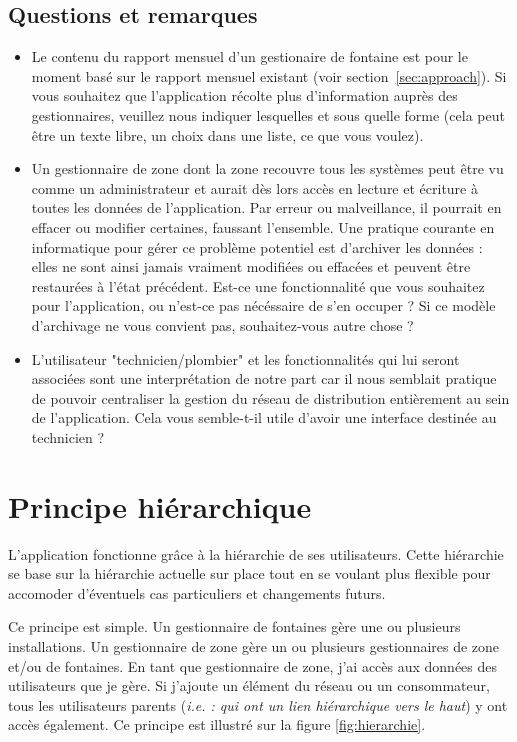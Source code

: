 \documentclass[a4paper, 11pt]{article}
\begin{document}
  \subsection{Questions et remarques}
  \begin{itemize}
    \item Le contenu du rapport mensuel d'un gestionaire de fontaine est pour le moment basé sur le rapport mensuel existant (voir section~\ref{sec:approach}). Si vous souhaitez que l'application récolte plus d'information auprès des gestionnaires, veuillez nous indiquer lesquelles et sous quelle forme (cela peut être un texte libre, un choix dans une liste, ce que vous voulez).
    \item Un gestionnaire de zone dont la zone recouvre tous les systèmes peut être vu comme un administrateur et aurait dès lors accès en lecture et écriture à toutes les données de l'application. Par erreur ou malveillance, il pourrait en effacer ou modifier certaines, faussant l'ensemble. Une pratique courante en informatique pour gérer ce problème potentiel est d'archiver les données : elles ne sont ainsi jamais vraiment modifiées ou effacées et peuvent être restaurées à l'état précédent. Est-ce une fonctionnalité que vous souhaitez pour l'application, ou n'est-ce pas nécéssaire de s'en occuper ? Si ce modèle d'archivage ne vous convient pas, souhaitez-vous autre chose ?
    \item L'utilisateur "technicien/plombier" et les fonctionnalités qui lui seront associées sont une interprétation de notre part car il nous semblait pratique de pouvoir centraliser la gestion du réseau de distribution entièrement au sein de l'application. Cela vous semble-t-il utile d'avoir une interface destinée au technicien ?
  \end{itemize}

  \section{Principe hiérarchique}
    L'application fonctionne grâce à la hiérarchie de ses utilisateurs. Cette hiérarchie se base sur la hiérarchie actuelle sur place tout en se voulant plus flexible pour accomoder d'éventuels cas particuliers et changements futurs.

    Ce principe est simple. Un gestionnaire de fontaines gère une ou plusieurs installations. Un gestionnaire de zone gère un ou plusieurs gestionnaires de zone et/ou de fontaines. En tant que gestionnaire de zone, j'ai accès aux données des utilisateurs que je gère. Si j'ajoute un élément du réseau ou un consommateur, tous les utilisateurs parents (\emph{i.e. : qui ont un lien hiérarchique vers le haut}) y ont accès également. Ce principe est illustré sur la figure \ref{fig:hierarchie}.
\end{document}
